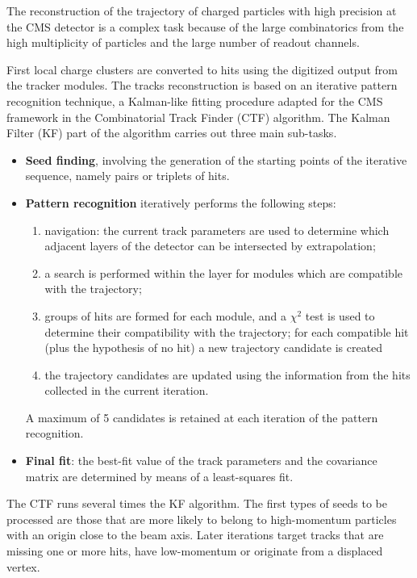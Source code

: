 The reconstruction of the trajectory of charged particles with high precision at the CMS detector
is a complex task because of the large combinatorics from the high multiplicity of particles and the large number of readout channels.

First local charge clusters are converted to hits using the digitized output from the tracker modules.
The tracks reconstruction is based on an iterative pattern recognition technique,
a Kalman-like fitting procedure adapted for the CMS framework in the Combinatorial Track Finder \cite{billoir.qian:simultaneous, Speer:2005dp} (CTF) algorithm.
The Kalman Filter (KF) part of the algorithm carries out three main sub-tasks.
\begin{itemize}
\item \textbf{Seed finding}, involving the generation of the starting points of the iterative sequence, namely pairs or triplets of hits.
\item \textbf{Pattern recognition} iteratively performs the following steps:
  \begin{enumerate}
  \item navigation: the current track parameters are used to determine which adjacent layers of the detector can be intersected by extrapolation;
  \item a search is performed within the layer for modules which are compatible with the trajectory;
  \item groups of hits are formed for each module, and a $\chi^2$ test is used to determine their compatibility with the trajectory;
    for each compatible hit (plus the hypothesis of no hit) a new trajectory candidate is created
  \item the trajectory candidates are updated using the information from the hits collected in the current iteration.
  \end{enumerate}
  A maximum of 5 candidates is retained at each iteration of the pattern recognition.
\item \textbf{Final fit}: the best-fit value of the track parameters and the covariance matrix are determined by means of a least-squares fit.
\end{itemize}
The CTF runs several times the KF algorithm.
The first types of seeds to be processed are those that are more likely to belong to high-momentum particles with an origin close to the beam axis.
Later iterations target tracks that are missing one or more hits, have low-momentum or originate from a displaced vertex.

